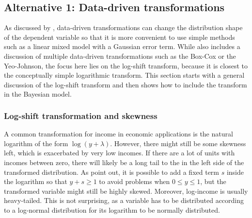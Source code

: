 \subsection{Alternative 1: Data-driven transformations}
\label{ch:log_shift}

As discussed by \cite{rojas_perilla_data_2020}, data-driven transformations can change the distribution shape of the dependent variable so that it is more convenient to use simple methods such as a linear mixed model with a Gaussian error term.
While \cite{rojas_perilla_data_2020} also includes a discussion of multiple data-driven transformations such as the Box-Cox or the Yeo-Johnson, the focus here lies on the log-shift transform, because it is closest to the conceptually simple logarithmic transform.
This section starts with a general discussion of the log-shift transform and then shows how to include the transform in the Bayesian model.

\subsubsection{Log-shift transformation and skewness}
A common transformation for income in economic applications is the natural logarithm of the form $\log(y + \lambda)$. However, there might still be some skewness left, which is exacerbated by very low incomes.
If there are a lot of units with incomes between zero, there will likely be a long tail to the in the left side of the transformed distribution.
As \cite{rojas_perilla_data_2020} point out, it is possible to add a fixed term $s$ inside the logarithm so that $y+s \ge 1$ to avoid problems when $0 \le y \le 1$,
but the transformed variable might still be highly skewed.
Moreover, log-income is usually heavy-tailed.
This is not surprising, as a variable has to be distributed according to a log-normal distribution for its logarithm to be normally distributed.

